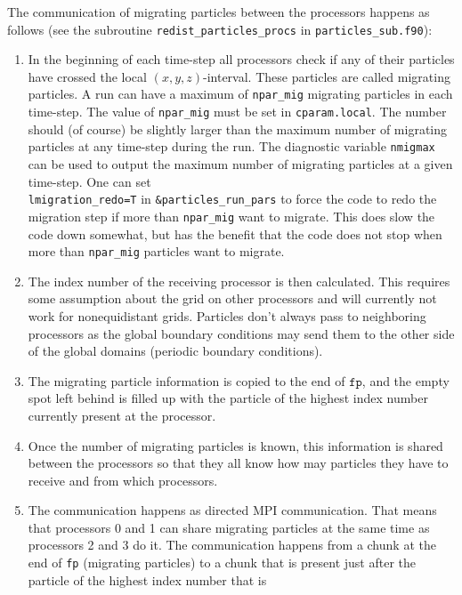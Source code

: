 \documentclass[\mydriver,12pt,twoside,notitlepage,a4paper]{article}
\newcommand{\code}[1]{\texttt{#1}}
\begin{document}
The communication of migrating particles between the processors happens as
follows (see the subroutine \code{redist_particles_procs} in
\code{particles_sub.f90}):
\begin{enumerate}
  \item In the beginning of each time-step all processors check if any of their
      particles have crossed the local $(x,y,z)$-interval. These particles are
      called migrating particles. A run can have a maximum of \code{npar_mig}
      migrating particles in each time-step. The value of \code{npar_mig} must
      be set in \code{cparam.local}. The number should (of course) be slightly
      larger than the maximum number of migrating particles at any time-step
      during the run. The diagnostic variable \code{nmigmax} can be used to
      output the maximum number of migrating particles at a given time-step.
      One can set\\ \code{lmigration_redo=T} in \code{\&particles_run_pars} to
      force the code to redo the migration step if more than \code{npar_mig}
      want to migrate. This does slow the code down somewhat, but has the
      benefit that the code does not stop when more than \code{npar_mig}
      particles want to migrate.
  \item The index number of the receiving processor is then calculated. This
      requires some assumption about the grid on other processors and will
      currently not work for nonequidistant grids. Particles don't always pass
      to neighboring processors as the global boundary conditions may send
      them to the other side of the global domains (periodic boundary
      conditions).
  \item The migrating particle information is copied to the end of $\code{fp}$,
      and the empty spot left behind is filled up with the particle of the
      highest index number currently present at the processor.
  \item Once the number of migrating particles is known, this information is
      shared between the processors so that they all know how may particles
      they have to receive and from which processors.
  \item The communication happens as directed MPI communication. That means
      that processors 0 and 1 can share migrating particles at the
      same time as processors 2 and 3 do it. The communication happens from a
      chunk at the end of \code{fp} (migrating particles) to a chunk that is
      present just after the particle of the highest index number that is

\end{enumerate}
\end{document}
